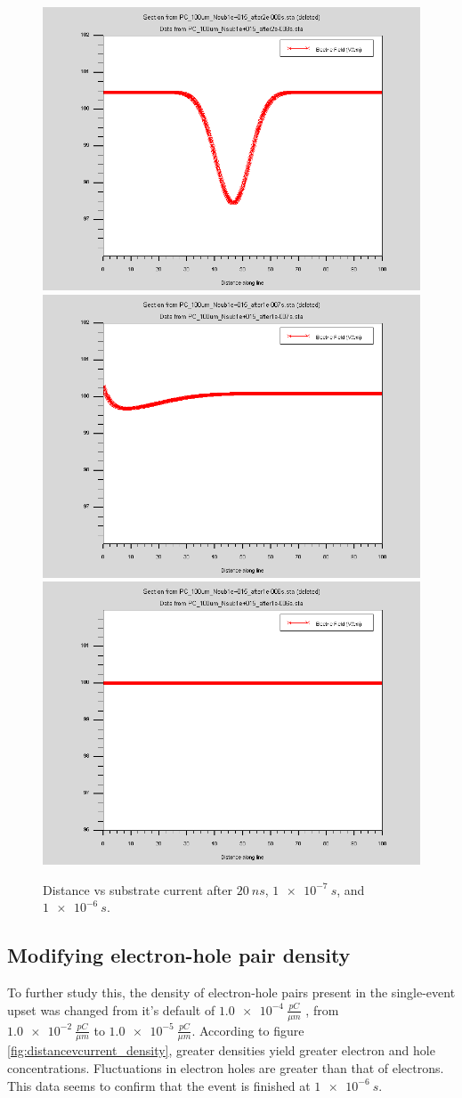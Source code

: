 \documentclass[12pt]{article}
\begin{document}
\begin{figure}[htp]
  \centering
  \includegraphics[width=.3\textwidth]{PC_100um_Nsub1e+015_after2e-008s}\hfill
  \includegraphics[width=.3\textwidth]{PC_100um_Nsub1e+015_after1e-007s}\hfill
  \includegraphics[width=.3\textwidth]{PC_100um_Nsub1e+015_after1e-006s}
  \caption{Distance vs substrate current after $\SI{20}{ns}$, $\SI{1e-7}{s}$, and $\SI{1e-6}{s}$.}
  \label{fig:distancevcurrent}
\end{figure}

\subsection{Modifying electron-hole pair density}

To further study this, the density of electron-hole pairs present in the single-event upset was changed from it's default of $\SI{1.0e-4}{\frac{pC}{{\mu}m}}$ , from \\$\SI{1.0e-2}{\frac{pC}{{\mu}m}}$ to $\SI{1.0e-5}{\frac{pC}{{\mu}m}}$. According to figure \ref{fig:distancevcurrent_density}, greater densities yield greater electron and hole concentrations. Fluctuations in electron holes are greater than that of electrons. This data seems to confirm that the event is finished at $\SI{1e-6}{s}$.
\end{document}
